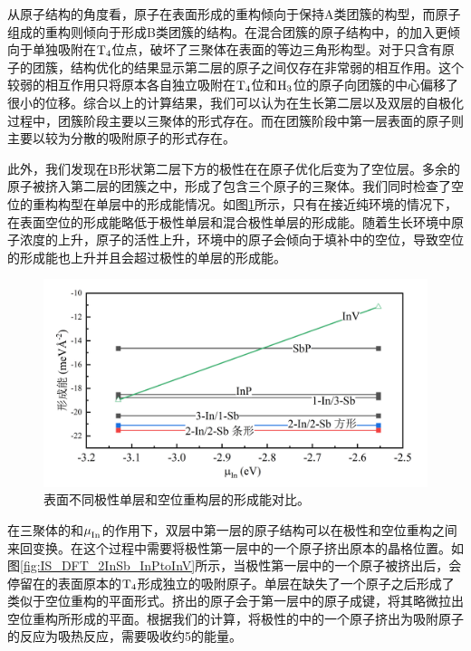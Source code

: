 从原子结构的角度看，原子在表面形成的重构倾向于保持A类团簇的构型，而原子组成的重构则倾向于形成B类团簇的结构。在混合团簇的原子结构中，的加入更倾向于单独吸附在$\rm T_{4} \it$位点，破坏了三聚体在表面的等边三角形构型。对于只含有原子的团簇，结构优化的结果显示第二层的原子之间仅存在非常弱的相互作用。这个较弱的相互作用只将原本各自独立吸附在$\rm T_{4} \it$位和$\rm H_{3} \it$位的原子向团簇的中心偏移了很小的位移。综合以上的计算结果，我们可以认为在生长第二层以及双层的自极化过程中，团簇阶段主要以三聚体的形式存在。而在团簇阶段中第一层表面的原子则主要以较为分散的吸附原子的形式存在。

此外，我们发现在B形状第二层下方的极性在在原子优化后变为了空位层。多余的原子被挤入第二层的团簇之中，形成了包含三个原子的三聚体。我们同时检查了空位的重构构型在单层中的形成能情况。如图\ref{fig:IS_DFT_1InSb_FlipVsInV}所示，只有在接近纯环境的情况下，在表面空位的形成能略低于极性单层和混合极性单层的形成能。随着生长环境中原子浓度的上升，原子的活性上升，环境中的原子会倾向于填补中的空位，导致空位的形成能也上升并且会超过极性的单层的形成能。

\begin{figure}[!htb]
    \includegraphics{pic/IS_DFT_1InSb_FlipVsInV.png}
    \caption{表面不同极性单层和空位重构层的形成能对比。}
    \label{fig:IS_DFT_1InSb_FlipVsInV}
\end{figure}

在三聚体的和$\it \mu_{\rm In}^{\rm } \it$的作用下，双层中第一层的原子结构可以在极性和空位重构之间来回变换。在这个过程中需要将极性第一层中的一个原子挤出原本的晶格位置。如图\ref{fig:IS_DFT_2InSb_InPtoInV}所示，当极性第一层中的一个原子被挤出后，会停留在的表面原本的$\rm T_{4} \it$形成独立的吸附原子。单层在缺失了一个原子之后形成了类似于空位重构的平面形式。挤出的原子会于第一层中的原子成键，将其略微拉出空位重构所形成的平面。根据我们的计算，将极性的中的一个原子挤出为吸附原子的反应为吸热反应，需要吸收约\SI{5}{\mievpas}的能量。


